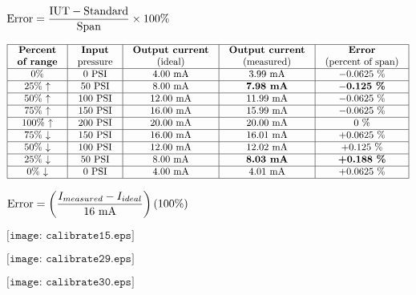 \documentclass[12pt,a4paper,margin=2cm]{book}
\def\lthtmlcheckvsize{\ifdim\ht\sizebox<\vsize 
  \ifdim\wd\sizebox<\hsize\expandafter\hfill\fi \expandafter\vfill
  \else\expandafter\vss\fi}%
\begin{document}
{\newpage\clearpage
{}%
$\displaystyle \hbox{Error} = {\hbox{IUT} - \hbox{Standard} \over \hbox{Span}} \times 100\%$%
\lthtmlindisplaymathZ
\lthtmlcheckvsize\clearpage}

{\newpage\clearpage
{}%
$\displaystyle \vbox{\offinterlineskip
\halign{\strut
\vrule \quad\hfil # \  \hfil & 
\vrule \quad\hfil # \  \hfil & 
\vrule \quad\hfil # \  \hfil & 
\vrule \quad\hfil # \  \hfil & 
\vrule \quad\hfil # \  \hfil \vrule \cr
\noalign{\hrule }
\textbf{Percent} & \textbf{Input} & \textbf{Output current} & \textbf{Output current} & \textbf{Error} \cr
\textbf{of range} & pressure & (ideal) & (measured) & (percent of span) \cr
\noalign{\hrule }
0\% & 0 PSI & 4.00 mA & 3.99 mA & $-0.0625$ \% \cr
\noalign{\hrule }
25\% $\uparrow$ & 50 PSI & 8.00 mA & \textbf{7.98 mA} & \textbf{$-$0.125 \%} \cr
\noalign{\hrule }
50\% $\uparrow$ & 100 PSI & 12.00 mA & 11.99 mA & $-0.0625$ \% \cr
\noalign{\hrule }
75\% $\uparrow$ & 150 PSI & 16.00 mA & 15.99 mA & $-0.0625$ \% \cr
\noalign{\hrule }
100\% $\uparrow$ & 200 PSI & 20.00 mA & 20.00 mA & 0 \% \cr
\noalign{\hrule }
75\% $\downarrow$ & 150 PSI & 16.00 mA & 16.01 mA & +0.0625 \% \cr
\noalign{\hrule }
50\% $\downarrow$ & 100 PSI & 12.00 mA & 12.02 mA & +0.125 \% \cr
\noalign{\hrule }
25\% $\downarrow$ & 50 PSI & 8.00 mA & \textbf{8.03 mA} & \textbf{+0.188 \%} \cr
\noalign{\hrule }
0\% $\downarrow$ & 0 PSI & 4.00 mA & 4.01 mA & +0.0625 \% \cr
\noalign{\hrule }
} %
}$%
\lthtmlindisplaymathZ
\lthtmlcheckvsize\clearpage}

{\newpage\clearpage
{}%
$\displaystyle \hbox{Error} = \left( {{I_{measured} - I_{ideal}} \over 16 \hbox{ mA}} \right)  \left( 100 \% \right)$%
\lthtmlindisplaymathZ
\lthtmlcheckvsize\clearpage}

{\newpage\clearpage
{}%
$\displaystyle \texttt{[image: calibrate15.eps]}$%
\lthtmlindisplaymathZ
\lthtmlcheckvsize\clearpage}

{\newpage\clearpage
{}%
$\displaystyle \texttt{[image: calibrate29.eps]}$%
\lthtmlindisplaymathZ
\lthtmlcheckvsize\clearpage}

{\newpage\clearpage
{}%
$\displaystyle \texttt{[image: calibrate30.eps]}$%
\lthtmlindisplaymathZ
\lthtmlcheckvsize\clearpage}
\end{document}
